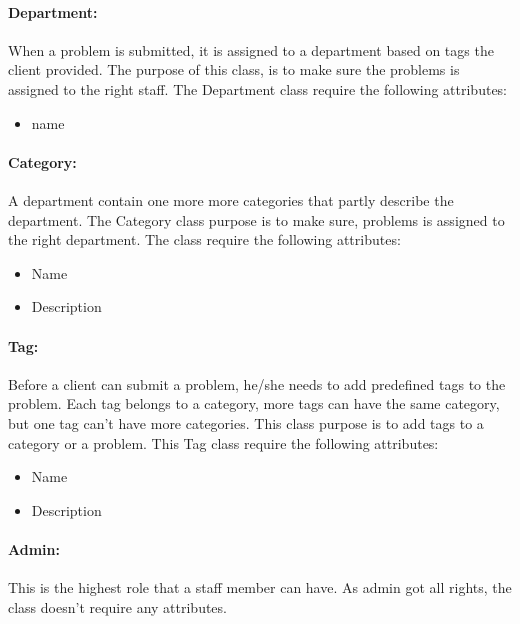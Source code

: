   \paragraph{Department:}When a problem is submitted, it is assigned to a department based on tags the client provided. The purpose of this class, is to make sure the problems is assigned to the right staff. The Department class require the following attributes:
\begin{itemize}
 \item{name}
\end{itemize}

 \paragraph{Category:}A department contain one more more categories that partly describe the department. The Category class purpose is to make sure, problems is assigned to the right department. The class require the following attributes:
\begin{itemize}
 \item{Name}
 \item{Description}
\end{itemize}
 
 \paragraph{Tag:}Before a client can submit a problem, he/she needs to add predefined tags to the problem. Each tag belongs to a category, more tags can have the same category, but one tag can't have more categories. This class purpose is to add tags to a category or a problem. This Tag class require the following attributes:
\begin{itemize}
 \item{Name}
 \item{Description}
\end{itemize}

 \paragraph{Admin:}This is the highest role that a staff member can have. As admin got all rights, the class doesn't require any attributes.
